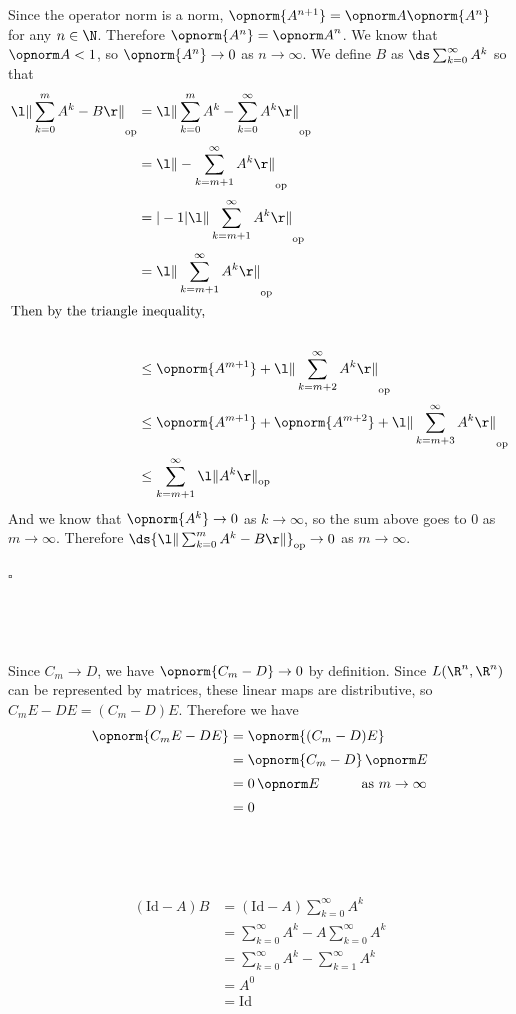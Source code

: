 \documentclass[a4paper]{article}
\begin{document}
\subsection{~} %

Since the operator norm is a norm, $\opnorm{A^{n+1}} = \opnorm A \opnorm{A^n}$ for any $n \in \N$. Therefore $\opnorm{A^n} = {\opnorm A}^n$. We know that $\opnorm A < 1$, so $\opnorm{A^n} \to 0$ as $n \to \infty$. We define $B$ as $\ds \sum_{k=0}^\infty A^k$ so that
\begin{align*}
{\l\| \sum_{k=0}^m A^k - B \r\|}_\mathrm{op} &= {\l\| \sum_{k=0}^m A^k - \sum_{k=0}^\infty A^k \r\|}_\mathrm{op} \\[0.5ex]
&= {\l\| - \sum_{k = m+1}^\infty A^k \r\|}_\mathrm{op} \\[0.5ex]
&= |-1| {\l\| \sum_{k = m+1}^\infty A^k \r\|}_\mathrm{op} \\[0.5ex]
&= {\l\| \sum_{k = m+1}^\infty A^k \r\|}_\mathrm{op} \\
\intertext{Then by the triangle inequality,} \\
&\le \opnorm{A^{m+1}} + {\l\| \sum_{k = m+2}^\infty A^k \r\|}_\mathrm{op} \\[0.5ex]
&\le \opnorm{A^{m+1}} + \opnorm{A^{m+2}} + {\l\| \sum_{k = m+3}^\infty A^k \r\|}_\mathrm{op} \\[0.5ex]
&\le \sum_{k = m+1}^\infty {\l\| A^k \r\|}_\mathrm{op}
\end{align*}
And we know that $\opnorm{A^k} \to 0$ as $k \to \infty$, so the sum above goes to $0$ as $m \to \infty$. Therefore $\ds {\l\| \sum_{k=0}^m A^k - B \r\|}_\mathrm{op} \to 0$ as $m \to \infty$.

\hfill $\square$

\subsection{~} %

Since $C_m \to D$, we have $\opnorm{C_m - D} \to 0$ by definition. Since $L(\R^n, \R^n)$ can be represented by matrices, these linear maps are distributive, so $C_m E - D E = (C_m - D) E$. Therefore we have
\begin{align*}
\opnorm{C_m E - D E} &= \opnorm{(C_m - D) E} \\[0.5ex]
&= \opnorm{C_m - D} \, \opnorm E \\[0.5ex]
&= 0 \, \opnorm E \quad\qquad\text{as } m \to \infty \\[0.5ex]
&= 0
\end{align*}

\subsection{~} %

\begin{align*}
(\mathrm{Id} - A) B &= (\mathrm{Id} - A) \sum_{k=0}^\infty A^k \\[0.5ex]
&= \sum_{k=0}^\infty A^k - A \sum_{k=0}^\infty A^k \\[0.5ex]
&= \sum_{k=0}^\infty A^k - \sum_{k=1}^\infty A^k \\[0.5ex]
&= A^0 \\[0.5ex]
&= \mathrm{Id}
\end{align*}

\end{document}
